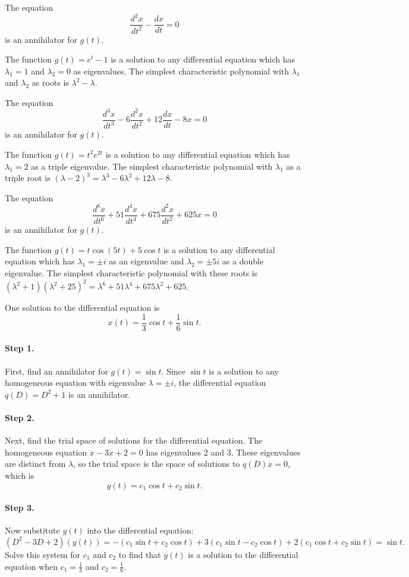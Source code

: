  \ans The equation
\[
\frac{d^2x}{dt^2} - \frac{dx}{dt} = 0
\]
is an annihilator for $g(t)$.

\soln The function $g(t) = e^t - 1$ is a solution to any differential equation
which has $\lambda_1 = 1$ and $\lambda_2 = 0$ as eigenvalues.  The
simplest characteristic polynomial with $\lambda_1$ and $\lambda_2$ as
roots is $\lambda^2 - \lambda$.

 \ans The equation
\[
\frac{d^3x}{dt^3} - 6\frac{d^2x}{dt^2} + 12\frac{dx}{dt} - 8x = 0
\]
is an annihilator for $g(t)$.

\soln The function $g(t) = t^2e^{2t}$ is a solution to any differential
equation which has $\lambda_1 = 2$ as a triple eigenvalue.  The simplest
characteristic polynomial with $\lambda_1$ as a triple root is
$(\lambda - 2)^3 = \lambda^3 - 6\lambda^2 + 12\lambda - 8$.

 \ans The equation
\[
\frac{d^6x}{dt^6} + 51\frac{d^4x}{dt^4} + 675\frac{d^2x}{dt^2} + 625x = 0
\]
is an annihilator for $g(t)$.

\soln The function $g(t) = t\cos(5t) + 5\cos t$ is a solution to any
differential equation which has $\lambda_1 = \pm i$ as an eigenvalue and
$\lambda_2 = \pm 5i$ as a double eigenvalue.  The simplest characteristic
polynomial with these roots is
$(\lambda^2 + 1)(\lambda^2 + 25)^2 = \lambda^6 + 51\lambda^4 + 675\lambda^2
+ 625$.

 \ans One solution to the differential equation is
\[
x(t) = \frac{1}{3}\cos t + \frac{1}{6}\sin t.
\]

\soln
\paragraph{Step 1.} First, find an annihilator for $g(t) = \sin t$.  Since
$\sin t$ is a solution to any homogeneous equation with eigenvalue
$\lambda = \pm i$, the differential equation $q(D) = D^2 + 1$ is an
annihilator.

\paragraph{Step 2.} Next, find the trial space of solutions for the
differential equation.  The homogeneous equation $\ddot{x} - 3\dot{x}
+ 2 = 0$ has eigenvalues $2$ and $3$.  These eigenvalues are distinct
from $\lambda$, so the trial space is the space of solutions to $q(D)x
= 0$, which is
\[
y(t) = c_1\cos t + c_2\sin t.
\]
\paragraph{Step 3.} Now substitute $y(t)$ into the differential equation:
\[
(D^2 - 3D + 2)(y(t)) = -(c_1\sin t + c_2\cos t) + 3(c_1\sin t - c_2\cos t)
+ 2(c_1\cos t + c_2\sin t) = \sin t.
\]
Solve this system for $c_1$ and $c_2$ to find that $y(t)$ is a solution to
the differential equation when $c_1 = \frac{1}{3}$ and $c_2 = \frac{1}{6}$.

